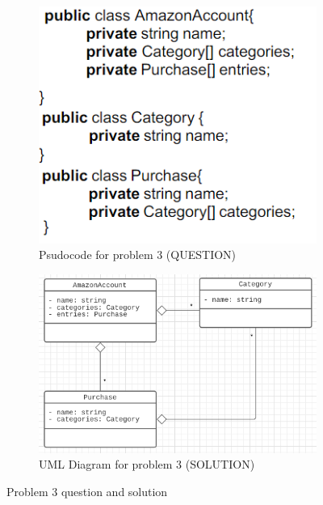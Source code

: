\documentclass[11pt]{article}
\begin{document}
\begin{figure}[H]
    \centering
    \begin{subfigure}{0.28\textwidth}
		\centering
		\includegraphics[width=\textwidth]{./pics/prob3_prob.png}
		\caption{Psudocode for problem 3 (QUESTION)}
		\label{fig:prob3_prob}
	\end{subfigure}
	\begin{subfigure}{0.7\textwidth}
		\centering
		\includegraphics[width=\textwidth]{./pics/prob3_sol.png}
		\caption{UML Diagram for problem 3 (SOLUTION)}
		\label{fig:prob3_sol}
	\end{subfigure}
    \caption{Problem 3 question and solution}
    \label{fig:prob1}
\end{figure}
\end{document}

